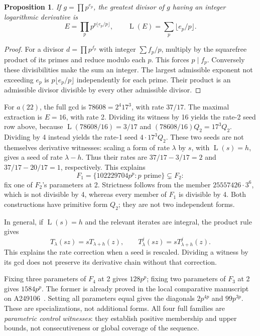 \documentclass[11pt]{article}
\newcommand{\Lrate}{\operatorname{L}}
\newtheorem{proposition}[theorem]{Proposition}
\theoremstyle{definition}
\begin{document}
\begin{proposition}\label{prop:extraction}
If $g=\prod p^{e_p}$, the greatest divisor of $g$ having an integer
logarithmic derivative is
\begin{equation}\label{eq:extract}
 E=\prod_p p^{p\lfloor e_p/p\rfloor},\qquad
 \Lrate(E)=\sum_p\lfloor e_p/p\rfloor.
\end{equation}
\end{proposition}
\begin{proof}
For a divisor $d=\prod p^{f_p}$ with integer $\sum f_p/p$, multiply
by the squarefree product of its primes and reduce modulo each $p$.
This forces $p\mid f_p$. Conversely these divisibilities make the sum
an integer. The largest admissible exponent not exceeding $e_p$ is
$p\lfloor e_p/p\rfloor$ independently for each prime. Their product
is an admissible divisor divisible by every other admissible divisor.
\end{proof}

For $a(22)$, the full gcd is $78608=2^4 17^3$, with rate $37/17$.
The maximal extraction is $E=16$, with rate 2. Dividing its witness by
16 yields the rate-2 seed row above, because
$\Lrate(78608/16)=3/17$ and
$(78608/16)Q_2=17^3Q_2$. Dividing by 4 instead yields the rate-1
seed $4\cdot17^3 Q_2$. These two seeds are not themselves derivative
witnesses: scaling a form of rate $\lambda$ by $s$, with
$\Lrate(s)=h$, gives a seed of rate $\lambda-h$.
Thus their rates are $37/17-3/17=2$ and
$37/17-20/17=1$, respectively. This explains
\[
 F_1=\{102229704p^p:p\text{ prime}\}\subsetneq F_2:
\]
fix one of $F_2$'s parameters at 2. Strictness follows from the member
$25557426\cdot3^6$, which is not divisible by 4, whereas every member
of $F_1$ is divisible by 4. Both constructions have primitive form
$Q_2$; they are not two independent forms.

In general, if $\Lrate(s)=h$ and the relevant iterates are integral,
the product rule gives
\[
 T_\lambda(sz)=sT_{\lambda+h}(z),\qquad
 T_\lambda^j(sz)=sT_{\lambda+h}^j(z).
\]
This explains the rate correction when a seed is rescaled. Dividing a
witness by its gcd does not preserve its derivative chain without that
correction.

Fixing three parameters of $F_4$ at 2 gives $128p^p$; fixing two
parameters of $F_3$ at 2 gives $1584p^p$. The former is already proved
in the local comparative manuscript on A249106~\cite{comparison}.
Setting all parameters equal gives the diagonals $2p^{4p}$ and
$99p^{3p}$. These are specializations, not additional forms. All four
full families are \emph{parametric control witnesses}: they establish
positive membership and upper bounds, not consecutiveness or global
coverage of the sequence.
\end{document}
